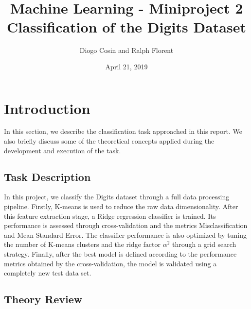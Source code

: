 \documentclass{article}
\title{Machine Learning - Miniproject 2 \\ \Large Classification of the Digits Dataset}
\author{Diogo Cosin and Ralph Florent}
\date{April 21, 2019}
\begin{document}
\maketitle



\section{Introduction}

In this section, we describe the classification task approached in this report. We also briefly discuss some of the theoretical concepts applied during the development and execution of the task.

\subsection{Task Description}

In this project, we classify the Digits dataset through a full data processing pipeline. Firstly, K-means is used to reduce the raw data dimensionality. After this feature extraction stage, a Ridge regression classifier is trained. Its performance is assessed through cross-validation and the metrics Misclassification and Mean Standard Error. The classifier performance is also optimized by tuning the number of K-means clusters and the ridge factor $\alpha^2$ through a grid search strategy. Finally, after the best model is defined according to the performance metrics obtained by the cross-validation, the model is validated using a completely new test data set.

\subsection{Theory Review}
\end{document}

